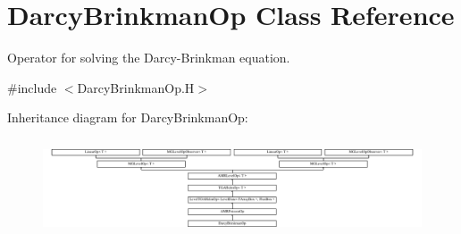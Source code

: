 \hypertarget{class_darcy_brinkman_op}{}\section{Darcy\+Brinkman\+Op Class Reference}
\label{class_darcy_brinkman_op}


Operator for solving the Darcy-\/\+Brinkman equation.  




{\ttfamily \#include $<$Darcy\+Brinkman\+Op.\+H$>$}

Inheritance diagram for Darcy\+Brinkman\+Op\+:\begin{figure}[H]
\begin{center}
\leavevmode
\includegraphics[height=2.865497cm]{class_darcy_brinkman_op}
\end{center}
\end{figure}
